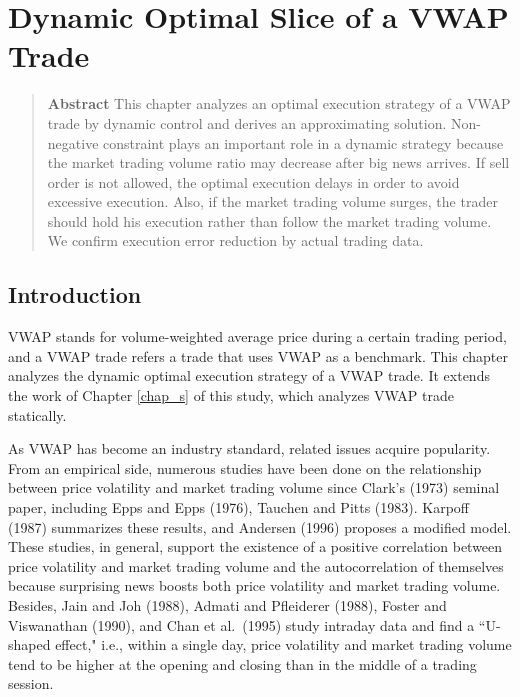


\chapter{Dynamic Optimal Slice of a VWAP Trade}\label{chap_d}


\begin{quote}
{\bf Abstract} \quad This chapter analyzes an optimal execution strategy of a 
VWAP trade by dynamic control and derives an approximating solution. Non-
negative constraint plays an important role in a dynamic strategy because the 
market trading volume ratio may decrease after big news arrives.  If sell order 
is not allowed, the optimal execution delays in order to avoid excessive execution.  
Also, if the market trading volume surges, the trader should hold his execution 
rather than follow the market trading volume.  We confirm execution error 
reduction by actual trading data.


\end{quote}


\section{Introduction}\label{sec_d1}
VWAP stands for volume-weighted average price during a certain trading period, 
and a VWAP trade refers a trade that uses VWAP as a benchmark.  This chapter 
analyzes the dynamic optimal execution strategy of a VWAP trade.  It extends the 
work of Chapter \ref{chap_s} of this study, which analyzes VWAP trade 
statically.  

As VWAP has become an industry standard, related issues acquire popularity.  
From an empirical side, numerous studies have been done on the relationship 
between price volatility and market trading volume since Clark's (1973) seminal 
paper, including Epps and Epps (1976), Tauchen and Pitts (1983).  Karpoff (1987) 
summarizes these results, and Andersen (1996) proposes a modified model.  These 
studies, in general, support the existence of a positive correlation between 
price volatility and market trading volume and the autocorrelation of themselves 
because surprising news boosts both price volatility and market trading volume.  
Besides, Jain and Joh (1988), Admati and Pfleiderer (1988), Foster and 
Viswanathan (1990), and Chan et al.~(1995) study intraday data and find
a
``U-shaped effect," i.e., within a single day, price volatility and market trading 
volume tend to be higher at the opening and closing than in the middle of a 
trading session. 

